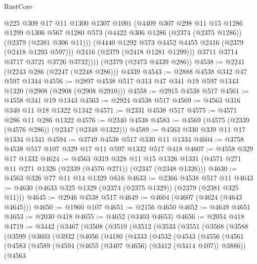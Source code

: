 \begin{lexlean}{RustCore}
\begin{coremodule}
            @225
            @309
            @17
            @11
            @1300
            @1307
            @1001
            (@4409
              @307
              @298
              @11
              @15
              @1286
              @1299
              @1306
              @567
              @1280
              @573
              (@4422 @306 @1286 (@2374 (@2375 @1286)) (@2379 (@2381 @306 @11)))
              (@4440 @1292 @573 @4452 @4455 @2416 (@2379 (@2418 @1293 @597)))
              @2416
              (@2379 (@2418 @1281 @1299)))
            @3711
            @3714
            @3717
            @3721
            @3726
            @3732))))
    (@2379 (@2473 @4339 @286))
@4538 := @2241 (@2243 @286 (@2247 (@2248 @286))) @4339
@4543 := @2888 @4538 @342 @47 @597 @1344
@4556 := @2897 @4538 @517 @313 @47 @341 @19 @597 @1343 @1320 (@2908 (@2908 (@2908 @2910)))
@4558 := @2915 @4538 @517
@4561 := @4558 @341 @19 @1343
@4563 := @2924 @4538 @517
@4569 := @4563 @316 @340 @11 @18 @1322 @1342
@4571 := @2331 @4538 @517
@4575 := @4571 @286 @11 @286 @1322
@4576 := @2340 @4538
@4583 := @4569 (@4575 (@2339 (@4576 @286)) (@2347 (@2348 @1322)))
@4589 := @4563 @330 @339 @11 @17 @1334 @1341
@4594 := @3749 @4538 @517 @330 @11 @1334
@4604 := @3758 @4538 @517 @107 @329 @17 @11 @597 @1332 @517 @418
@4607 := @4558 @329 @17 @1332
@4624 := @4563
    @319
    @328
    @11
    @15
    @1326
    @1331
    (@4571 @271 @11 @271 @1326 (@2339 (@4576 @271)) (@2347 (@2348 @1326)))
@4630 := @4563 @326 @77 @11 @14 @1329 @616
@4633 := @2366 @4538 @517 @11
@4643 := @4630 (@4633 @325 @1329 (@2374 (@2375 @1329)) (@2379 (@2381 @325 @11)))
@4645 := @2946 @4538 @517
@4649 := @4604 (@4607 (@4624 (@4643 @4645)))
@4650 := @1960 @107
@4651 := @2156 @4650
@4652 := @4649 @4651
@4653 := @2030 @418
@4655 := @4652 (@3403 @4653)
@4656 := @2054 @418
@4719 := @3442
    (@3467
      (@3508
        (@3510
          (@3512
            (@3533
              (@3551
                (@3568
                  (@3588
                    (@3599
                      (@3603
                        (@3932
                          (@4056
                            (@4180
                              (@4333
                                (@4532
                                  (@4543
                                    (@4556
                                      (@4561
                                        (@4583
                                          (@4589
                                            (@4594 (@4655 (@3407 @4656) (@3412 (@3414 @107)) @3886))
                                            (@4563

\end{coremodule}
\end{lexlean}
